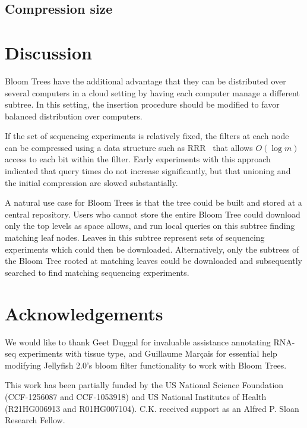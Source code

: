 \documentclass[11pt]{article}
\begin{document}
\subsection{Compression size}

\section{Discussion}

Bloom Trees have the additional advantage that they can be distributed over several computers in a cloud setting by having each computer manage a different subtree. In this setting, the insertion procedure should be modified to favor balanced distribution over computers.

If the set of sequencing experiments is relatively fixed, the filters at each node can be compressed using a data structure such as RRR~\cite{rrr} that allows $O(\log m)$ access to each bit within the filter. Early experiments with this approach indicated that query times do not increase significantly, but that unioning and the initial compression are slowed substantially.

A natural use case for Bloom Trees is that the tree could be built and stored at a central repository. Users who cannot store the entire Bloom Tree could download only the top levels as space allows, and run local queries on this subtree finding matching leaf nodes. Leaves in this subtree represent sets of sequencing experiments which could then be downloaded. Alternatively, only the subtrees of the Bloom Tree rooted at matching leaves could be downloaded and subsequently searched to find matching sequencing experiments.

\section*{Acknowledgements}

We would like to thank Geet Duggal for invaluable assistance annotating RNA-seq experiments with tissue type, and Guillaume Mar\c{c}ais for essential help modifying Jellyfish 2.0's bloom filter functionality to work with Bloom Trees. 

This work has been partially funded by the US National Science Foundation (CCF-1256087 and CCF-1053918) and US National Institutes of Health (R21HG006913 and R01HG007104). C.K. received support as an Alfred P. Sloan Research Fellow. 



\end{document}

